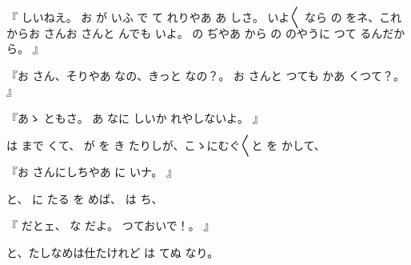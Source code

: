 『
しいねえ。
お
が
いふ
で
て
れりやあ
あ
しさ。
いよ〳〵
なら
の
をネ、これからお
さんお
さんと
んでも
いよ。
の
ぢやあ
から
の
のやうに
つて
るんだから。
』

『お
さん、そりやあ
なの、きっと
なの？。
お
さんと
つても
かあ
くつて？。
』

『あゝ
ともさ。
あ
なに
しいか
れやしないよ。
』

は
まで
くて、
が
を
き
たりしが、こゝにむぐ〳〵と
を
かして、

『お
さんにしちやあ
に
いナ。
』

と、
に
たる
を
めば、
は
ち、

『
だとェ、
な
だよ。
つておいで！。
』

と、たしなめは仕たけれど
は
てぬ
なり。

